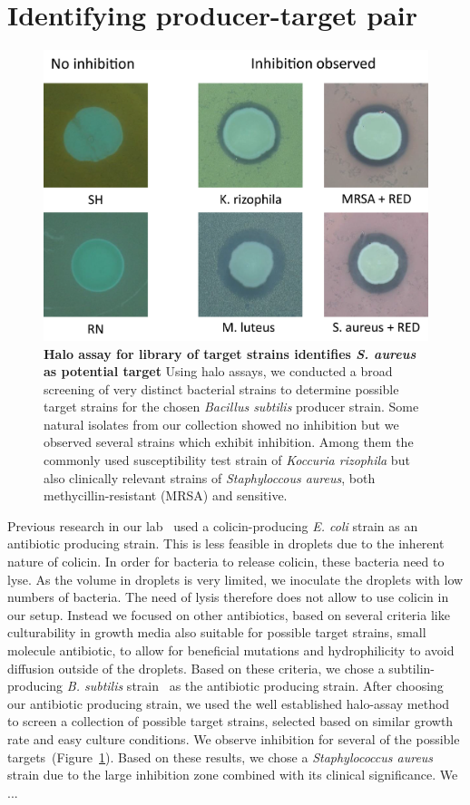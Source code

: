 \section{Identifying producer-target pair}
\begin{figure}
\centering
\includegraphics[width=\linewidth]{graphics/2025_09_30_droplets_fig7.png}
\caption{\textbf{Halo assay for library of target strains identifies \textit{S. aureus} as potential target} Using halo assays, we conducted a broad screening of very distinct bacterial strains to determine possible target strains for the chosen \textit{Bacillus subtilis} producer strain. Some natural isolates from our collection showed no inhibition but we observed several strains which exhibit inhibition. Among them the commonly used susceptibility test strain of \textit{Koccuria rizophila} but also clinically relevant strains of \textit{Staphyloccous aureus}, both methycillin-resistant (MRSA) and sensitive.}
\label{fig:results_sensitive_screening}
\end{figure}
Previous research in our lab~\cite{Gerardin2016-ac} used a colicin-producing \textit{E. coli} strain as an antibiotic producing strain. This is less feasible in droplets due to the inherent nature of colicin. In order for bacteria to release colicin, these bacteria need to lyse. As the volume in droplets is very limited, we inoculate the droplets with low numbers of bacteria. The need of lysis therefore does not allow to use colicin in our setup.
Instead we focused on other antibiotics, based on several criteria like culturability in growth media also suitable for possible target strains, small molecule antibiotic, to allow for beneficial mutations and hydrophilicity to avoid diffusion outside of the droplets. Based on these criteria, we chose a subtilin-producing \textit{B. subtilis} strain~\cite{Stein2002-nv, Zhang2022-ee} as the antibiotic producing strain.
After choosing our antibiotic producing strain, we used the well established halo-assay method to screen a collection of possible target strains, selected based on similar growth rate and easy culture conditions. We observe inhibition for several of the possible targets~(Figure~\ref{fig:results_sensitive_screening}). Based on these results, we chose a \textit{Staphylococcus aureus} strain due to the large inhibition zone combined with its clinical significance. We ...

